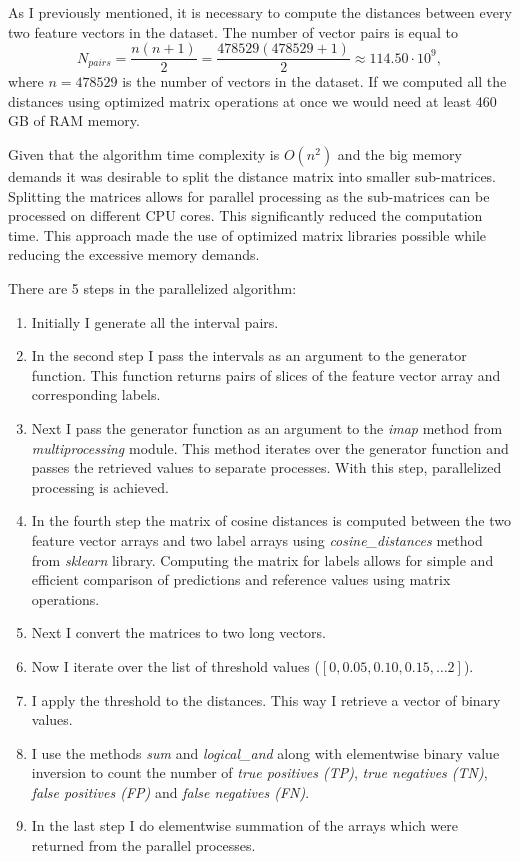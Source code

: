 As I previously mentioned, it is necessary to compute the distances between every two feature vectors in the dataset.
The number of vector pairs is equal to
\begin{equation}
    N_{pairs} = \frac{n\left(n+1\right)}{2} = \frac{478529\left(478529+1\right)}{2} \approx 114.50 \cdot 10^9,
\end{equation}
where $n = 478529$ is the number of vectors in the dataset.
If we computed all the distances using optimized matrix operations at once we would need at least 460 GB of RAM memory.

Given that the algorithm time complexity is $O(n^2)$ and the big memory demands it was desirable to split the distance
matrix into smaller sub-matrices.
Splitting the matrices allows for parallel processing as the sub-matrices can be processed on different CPU cores.
This significantly reduced the computation time.
This approach made the use of optimized matrix libraries possible while reducing the excessive memory demands.

There are 5 steps in the parallelized algorithm:
\begin{enumerate}
    \item Initially I generate all the interval pairs.
    \item In the second step I pass the intervals as an argument to the generator function.
    This function returns pairs of slices of the feature vector array and corresponding labels.
    \item Next I pass the generator function as an argument to the \textit{imap} method from \textit{multiprocessing}
    module.
    This method iterates over the generator function and passes the retrieved values to separate processes.
    With this step, parallelized processing is achieved.
    \item In the fourth step the matrix of cosine distances is computed between the two feature vector arrays
    and two label arrays using \textit{cosine\_distances} method from \textit{sklearn} library.
    Computing the matrix for labels allows for simple and efficient comparison of predictions and reference
    values using matrix operations.
    \item Next I convert the matrices to two long vectors.
    \item Now I iterate over the list of threshold values ($\left[ 0, 0.05, 0.10, 0.15, \ldots 2 \right]$).
    \item I apply the threshold to the distances.
    This way I retrieve a vector of binary values.
    \item I use the methods \textit{sum} and \textit{logical\_and} along with elementwise binary value inversion to
    count the number of \textit{true positives (TP)}, \textit{true negatives (TN)}, \textit{false positives (FP)} and
    \textit{false negatives (FN)}.
    \item In the last step I do elementwise summation of the arrays which were returned from the parallel processes.
\end{enumerate}

